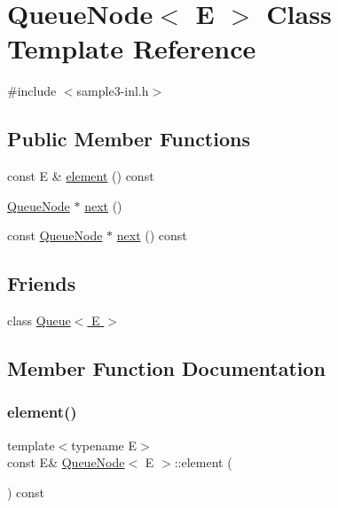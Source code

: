 \hypertarget{class_queue_node}{}\section{Queue\+Node$<$ E $>$ Class Template Reference}
\label{class_queue_node}


{\ttfamily \#include $<$sample3-\/inl.\+h$>$}

\subsection*{Public Member Functions}
\begin{DoxyCompactItemize}
\item 
const E \& \hyperlink{class_queue_node_a1c61b3ed32e089f5901b87022ef84985}{element} () const
\item 
\hyperlink{class_queue_node}{Queue\+Node} $\ast$ \hyperlink{class_queue_node_a8a9fdf488da06533360999ef85db56ea}{next} ()
\item 
const \hyperlink{class_queue_node}{Queue\+Node} $\ast$ \hyperlink{class_queue_node_ada477e4f309f29383112dbda473dd985}{next} () const
\end{DoxyCompactItemize}
\subsection*{Friends}
\begin{DoxyCompactItemize}
\item 
class \hyperlink{class_queue_node_ad4336229b1d7c3626e4ba69f236b202d}{Queue$<$ E $>$}
\end{DoxyCompactItemize}


\subsection{Member Function Documentation}
\mbox{\label{class_queue_node_a1c61b3ed32e089f5901b87022ef84985}} 
\subsubsection{\texorpdfstring{element()}{element()}}
{\footnotesize\ttfamily template$<$typename E$>$ \\
const E\& \hyperlink{class_queue_node}{Queue\+Node}$<$ E $>$\+::element (\begin{DoxyParamCaption}{ }\end{DoxyParamCaption}) const\hspace{0.3cm}{\ttfamily [inline]}}

